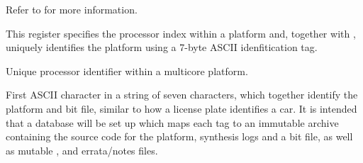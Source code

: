 \implementation{}

\implementation{}


Refer to  for more information.

\implementation{}

\implementation{}

\implementation{}

\implementation{}


This register specifies the processor index within a platform and, together with
, uniquely identifies the platform using a 7-byte ASCII
idenfitication tag.

\reset{********}
Unique processor identifier within a multicore platform.

\implementation{}

First ASCII character in a string of seven characters, which together identify 
the platform and bit file, similar to how a license plate identifies a car. It 
is intended that a database will be set up which maps each tag to an immutable 
archive containing the source code for the platform, synthesis logs and a bit 
file, as well as mutable ,  and errata/notes 
files.

